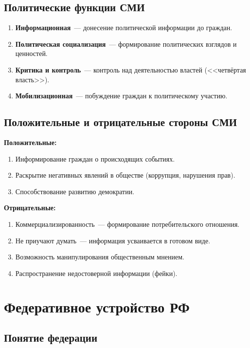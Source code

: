 \documentclass[12pt]{article}
\begin{document}
	\subsection{Политические функции СМИ}
	\begin{enumerate}
		\item \textbf{Информационная}~--- донесение политической информации до граждан.
		\item \textbf{Политическая социализация}~--- формирование политических взглядов и ценностей.
		\item \textbf{Критика и контроль}~--- контроль над деятельностью властей (<<четвёртая власть>>).
		\item \textbf{Мобилизационная}~--- побуждение граждан к политическому участию.
	\end{enumerate}
	
	\subsection{Положительные и отрицательные стороны СМИ}
	
	\textbf{Положительные:}
	\begin{enumerate}
		\item Информирование граждан о происходящих событиях.
		\item Раскрытие негативных явлений в обществе (коррупция, нарушения прав).
		\item Способствование развитию демократии.
	\end{enumerate}
	
	\noindent \textbf{Отрицательные:}
	\begin{enumerate}
		\item Коммерциализированность~--- формирование потребительского отношения.
		\item Не приучают думать~--- информация усваивается в готовом виде.
		\item Возможность манипулирования общественным мнением.
		\item Распространение недостоверной информации (фейки).
	\end{enumerate}
	
	\section{Федеративное устройство РФ}
	
	\subsection{Понятие федерации}
	
\end{document}
